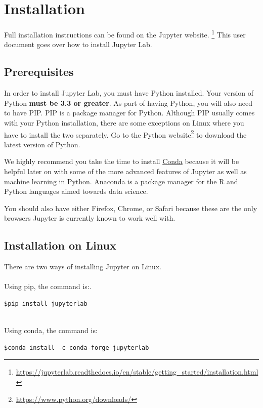 \documentclass[pdftex,12pt]{artikel3}
\begin{document}
\section{Installation}

Full installation instructions can be found on the Jupyter website. \footnote{\url{ https://jupyterlab.readthedocs.io/en/stable/getting_started/installation.html}} This user document goes over how to install Jupyter Lab.

\subsection{Prerequisites}
In order to install Jupyter Lab, you must have Python installed. Your version of Python \textbf{must be 3.3 or greater}. 
As part of having Python, you will also need to have PIP.
PIP is a package manager for Python. 
Although PIP usually comes with your Python installation, there are some exceptions on Linux where you have to install the two separately.
Go to the Python website\footnote{\url{ https://www.python.org/downloads/}} to download the latest version of Python.


We highly recommend you take the time to install \href{https://docs.conda.io/projects/conda/en/latest/user-guide/install/}{Conda} because it will be helpful later on with some of the more advanced features of Jupyter as well as machine learning in Python.
Anaconda is a package manager for the R and Python languages aimed towards data science.


You should also have either Firefox, Chrome, or Safari because these are the only browsers Jupyter is currently known to work well with.

\subsection{Installation on Linux}
There are two ways of installing Jupyter on Linux.\\
\\
Using pip, the command is:.\\
\begin{lstlisting}
$pip install jupyterlab
\end{lstlisting}

\\
Using conda, the command is:
\begin{lstlisting}
$conda install -c conda-forge jupyterlab
\end{lstlisting}
\end{document}
